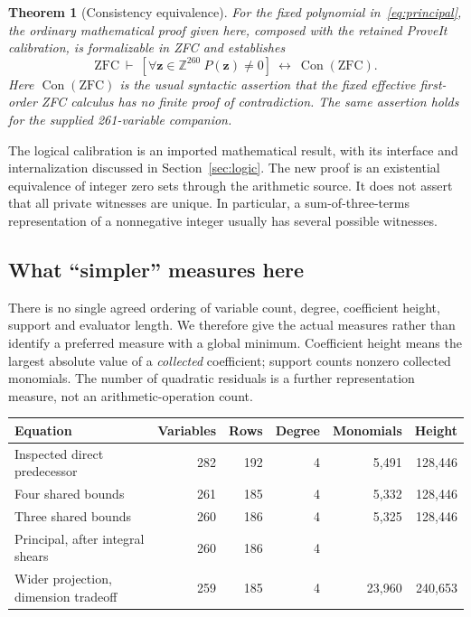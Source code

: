 \documentclass[10pt,letterpaper]{article}
\newtheorem{theorem}{Theorem}[section]
\theoremstyle{definition}\newtheorem{definition}[theorem]{Definition}
\newcommand{\ZZ}{\mathbb Z}
\newcommand{\Con}{\operatorname{Con}}
\begin{document}
\begin{theorem}[Consistency equivalence]\label{thm:main}
For the fixed polynomial in~\eqref{eq:principal}, the ordinary mathematical
proof given here, composed with the retained ProveIt calibration, is
formalizable in ZFC and establishes
\[
 \mathrm{ZFC}\ \vdash\
 \left[\forall\mathbf z\in\ZZ^{260}\ P(\mathbf z)\ne0\right]
 \ \longleftrightarrow\ \Con(\mathrm{ZFC}).
\]
Here $\Con(\mathrm{ZFC})$ is the usual syntactic assertion that the fixed
effective first-order ZFC calculus has no finite proof of contradiction.
The same assertion holds for the supplied 261-variable companion.
\end{theorem}

The logical calibration is an imported mathematical result, with its
interface and internalization discussed in Section~\ref{sec:logic}. The
new proof is an existential equivalence of integer zero sets through the
arithmetic source. It does not assert that all private witnesses are unique.
In particular, a sum-of-three-terms representation of a nonnegative integer
usually has several possible witnesses.

\subsection{What ``simpler'' measures here}

There is no single agreed ordering of variable count, degree, coefficient
height, support and evaluator length. We therefore give the actual measures
rather than identify a preferred measure with a global minimum. Coefficient
height means the largest absolute value of a \emph{collected} coefficient;
support counts nonzero collected monomials. The number of quadratic
residuals is a further representation measure, not an arithmetic-operation
count.

\begin{center}\small
\begin{tabular}{lrrrrr}
\toprule
Equation & Variables & Rows & Degree & Monomials & Height\\
\midrule
Inspected direct predecessor &282&192&4&5,491&128,446\\
Four shared bounds &261&185&4&5,332&128,446\\
Three shared bounds &260&186&4&5,325&128,446\\
Principal, after integral shears &260&186&4&\FinalTerms&\FinalHeight\\
Wider projection, dimension tradeoff &259&185&4&23,960&240,653\\
\bottomrule
\end{tabular}
\end{center}
\end{document}
